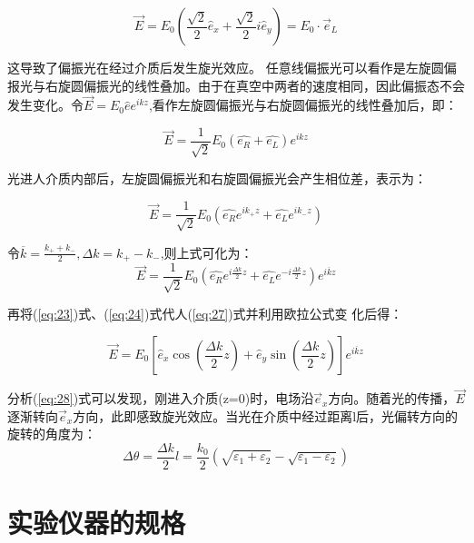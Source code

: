 \documentclass[12pt]{ctexart}
\numberwithin{equation}{section} %
\begin{document}
\begin{equation}
    \overrightarrow{E}=E_{0}\left(\frac{\sqrt{2}}{2}\widehat{e}_{x}+\frac{\sqrt{2}}{2}i\widehat{e}_{y}\right)=E_{0}\cdot\overrightarrow{e}_{L}
    \label{eq:24}
\end{equation}

这导致了偏振光在经过介质后发生旋光效应。
任意线偏振光可以看作是左旋圆偏报光与右旋圆偏振光的线性叠加。由于在真空中两者的速度相同，因此偏振态不会发生变化。令$\overrightarrow{E}=E_0\widehat{e}e^{ikz}$,看作左旋圆偏振光与右旋圆偏振光的线性叠加后，即：


\begin{equation}
    \overrightarrow{E}=\frac{1}{\sqrt{2}}E_{0}\left(\widehat{e_{R}}+\widehat{e_{L}}\right)e^{ikz}
    \label{eq:25}
    \end{equation}
    \par 光进人介质内部后，左旋圆偏振光和右旋圆偏振光会产生相位差，表示为：

\begin{equation}
    \overrightarrow{E} = \frac{1}{\sqrt{2}}E_{0} \left(\widehat{e_R}e^{ik_+ z} + \widehat{e_L}e^{ik_- z}\right)
    \label{eq:26}
    \end{equation}
    \par 令$\overline{k}=\frac{k_{+}+k_{-}}{2},\Delta k=k_{+}-k_{-}$,则上式可化为：
\begin{equation}
    \overrightarrow{E} = \frac{1}{\sqrt{2}}E_{0} (\widehat{e_R}e^{i \frac{\Delta k}{2} z} + \widehat{e_L}e^{-i \frac{\Delta k}{2} z})e^{i\overline{k}z}
    \label{eq:27}
    \end{equation}
    \par 再将(\ref{eq:23})式、(\ref{eq:24})式代人(\ref{eq:27})式并利用欧拉公式变
化后得：

\begin{equation}
    \overrightarrow{E}=E_{0}\left[\widehat{e}_{x}\cos\left(\frac{\Delta k}{2}z\right)+\widehat{e}_{y}\sin\left(\frac{\Delta k}{2}z\right)\right]e^{i\overline{k}z}
    \label{eq:28}
\end{equation}
 \par 分析(\ref{eq:28})式可以发现，刚进入介质(z=0)时，电场沿$\vec{e}_x$方向。随着光的传播，$\vec{E}$ 逐渐转向$\vec{e}_x$方向，此即感致旋光效应。当光在介质中经过距离l后，光偏转方向的旋转的角度为：
\begin{equation}
\Delta\theta=\frac{\Delta k}{2}l=\frac{k_{0}}{2}\left(\sqrt{\varepsilon_{1}+\varepsilon_{2}}-\sqrt{\varepsilon_{1}-\varepsilon_{2}}\right)
\end{equation}
\section{实验仪器的规格}
\end{document}
